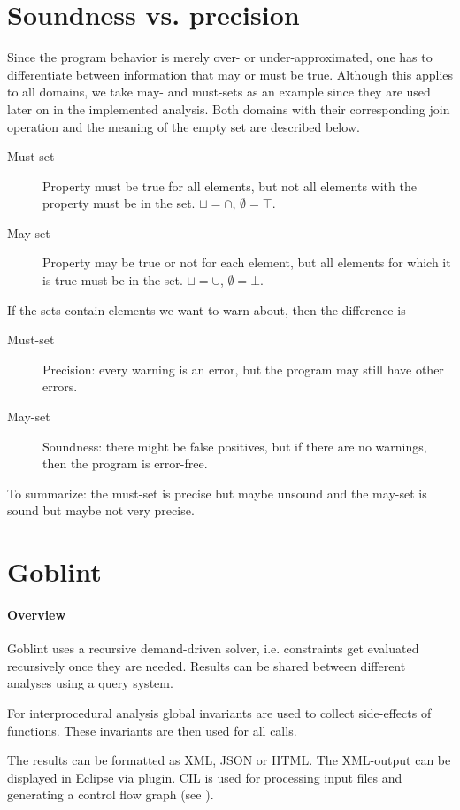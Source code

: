 \section{Soundness vs. precision}
Since the program behavior is merely over- or under-approximated, one has to differentiate between information that may or must be true. Although this applies to all domains, we take may- and must-sets as an example since they are used later on in the implemented analysis. Both domains with their corresponding join operation and the meaning of the empty set are described below.
\begin{description}
\item[Must-set] Property must be true for all elements, but not all elements with the property must be in the set. $\sqcup = \cap$, $\emptyset = \top$.
\item[May-set] Property may be true or not for each element, but all elements for which  it is true must be in the set. $\sqcup = \cup$, $\emptyset = \bot$.
\end{description}
If the sets contain elements we want to warn about, then the difference is
\begin{description}
\item[Must-set] Precision: every warning is an error, but the program may still have other errors.
\item[May-set] Soundness: there might be false positives, but if there are no warnings, then the program is error-free.
\end{description}
To summarize: the must-set is precise but maybe unsound and the may-set is sound but maybe not very precise.


\section{Goblint}
\paragraph*{Overview}
Goblint uses a recursive demand-driven solver, i.e. constraints get evaluated recursively once they are needed. Results can be shared between different analyses using a query system.

For interprocedural analysis global invariants are used to collect side-effects of functions. These invariants are then used for all calls.

The results can be formatted as XML, JSON or HTML. The XML-output can be displayed in Eclipse via plugin. CIL is used for processing input files and generating a control flow graph (see ).

